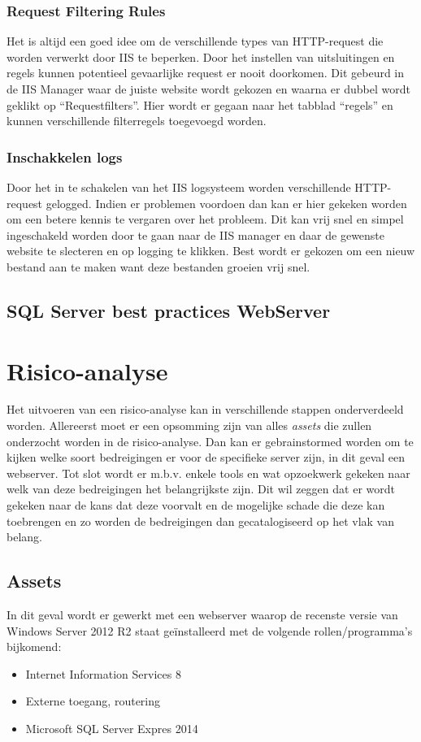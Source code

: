 \documentclass[pdftex,a4paper,12pt]{report}
\begin{document}
\subsection{Request Filtering Rules}
Het is altijd een goed idee om de verschillende types van HTTP-request die worden verwerkt door IIS te beperken. Door het instellen van uitsluitingen en regels kunnen potentieel gevaarlijke request er nooit doorkomen. Dit gebeurd in de IIS Manager waar de juiste website wordt gekozen en waarna er dubbel wordt geklikt op "`Requestfilters"'. Hier wordt er gegaan naar het tabblad "`regels"' en kunnen verschillende filterregels toegevoegd worden.

\subsection{Inschakkelen logs}
Door het in te schakelen van het IIS logsysteem worden verschillende HTTP-request gelogged. Indien er problemen voordoen dan kan er hier gekeken worden om een betere kennis te vergaren over het probleem. Dit kan vrij snel en simpel ingeschakeld worden door te gaan naar de IIS manager en daar de gewenste website te slecteren en op logging te klikken. Best wordt er gekozen om een nieuw bestand aan te maken want deze bestanden groeien vrij snel.

\section{SQL Server best practices WebServer}

\chapter{Risico-analyse}
Het uitvoeren van een risico-analyse kan in verschillende stappen onderverdeeld worden. Allereerst moet er een opsomming zijn van alles \textit{assets} die zullen onderzocht worden in de risico-analyse. Dan kan er gebrainstormed worden om te kijken welke soort bedreigingen er voor de specifieke server zijn, in dit geval een webserver. Tot slot wordt er m.b.v. enkele tools en wat opzoekwerk gekeken naar welk van deze bedreigingen het belangrijkste zijn. Dit wil zeggen dat er wordt gekeken naar de kans dat deze voorvalt en de mogelijke schade die deze kan toebrengen en zo worden de bedreigingen dan gecatalogiseerd op het vlak van belang.

\section{Assets}
In dit geval wordt er gewerkt met een webserver waarop de recenste versie van Windows Server 2012 R2 staat geïnstalleerd met de volgende rollen/programma's bijkomend:
\begin{itemize}
	\item Internet Information Services 8
	\item Externe toegang, routering
	\item Microsoft SQL Server Expres 2014 
\end{itemize}
\end{document}

